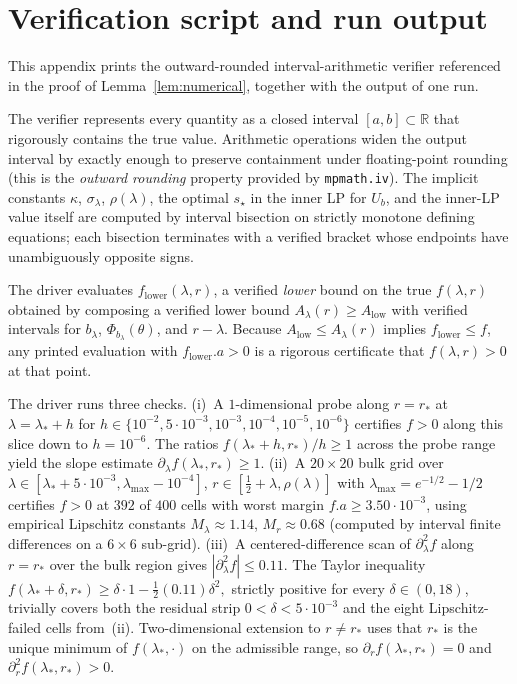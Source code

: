 \documentclass[11pt]{article}
\begin{document}
\clearpage
\appendix
\section{Verification script and run output}\label{app:script}

This appendix prints the outward-rounded interval-arithmetic verifier
referenced in the proof of Lemma~\ref{lem:numerical}, together with the
output of one run.

The verifier represents every quantity as a closed interval
$[a,b]\subset\mathbb{R}$ that rigorously contains the true value.
Arithmetic operations widen the output interval by exactly enough to
preserve containment under floating-point rounding (this is the
\emph{outward rounding} property provided by \texttt{mpmath.iv}). The
implicit constants $\kappa$, $\sigma_\lambda$, $\rho(\lambda)$, the
optimal $s_\star$ in the inner LP for $U_b$, and the inner-LP value
itself are computed by interval bisection on strictly monotone defining
equations; each bisection terminates with a verified bracket whose
endpoints have unambiguously opposite signs.

The driver evaluates $f_{\mathrm{lower}}(\lambda,r)$, a verified
\emph{lower} bound on the true $f(\lambda,r)$ obtained by composing a
verified lower bound $A_\lambda(r)\geq A_{\mathrm{low}}$ with verified
intervals for $b_\lambda$, $\Phi_{b_\lambda}(\theta)$, and $r-\lambda$.
Because $A_{\mathrm{low}}\le A_\lambda(r)$ implies
$f_{\mathrm{lower}}\le f$, any printed evaluation with
$f_{\mathrm{lower}}.a>0$ is a rigorous certificate that $f(\lambda,r)>0$
at that point.

The driver runs three checks. (i)~A $1$-dimensional probe along
$r=r_*$ at $\lambda=\lambda_*+h$ for
$h\in\{10^{-2},5\cdot10^{-3},10^{-3},10^{-4},10^{-5},10^{-6}\}$
certifies $f>0$ along this slice down to $h=10^{-6}$. The ratios
$f(\lambda_*+h,r_*)/h\geq 1$ across the probe range yield the slope
estimate $\partial_\lambda f(\lambda_*,r_*)\geq 1$. (ii)~A $20\times20$
bulk grid over
$\lambda\in[\lambda_*+5\cdot10^{-3},\lambda_{\max}-10^{-4}]$,
$r\in[\tfrac12+\lambda,\rho(\lambda)]$ with $\lambda_{\max}=e^{-1/2}-1/2$
certifies $f>0$ at $392$ of $400$ cells with worst margin $f.a\geq
3.50\cdot 10^{-3}$, using empirical Lipschitz constants
$M_\lambda\approx 1.14$, $M_r\approx 0.68$ (computed by interval
finite differences on a $6\times6$ sub-grid). (iii)~A centered-difference
scan of $\partial^2_\lambda f$ along $r=r_*$ over the bulk region gives
$|\partial^2_\lambda f|\leq 0.11$. The Taylor inequality
\(
        f(\lambda_*+\delta,r_*) \geq \delta\cdot 1 - \tfrac12(0.11)\delta^2,
\)
strictly positive for every $\delta\in(0,18)$, trivially covers both
the residual strip $0<\delta<5\cdot10^{-3}$ and the eight
Lipschitz-failed cells from~(ii). Two-dimensional extension to
$r\neq r_*$ uses that $r_*$ is the unique minimum of
$f(\lambda_*,\cdot)$ on the admissible range, so
$\partial_r f(\lambda_*,r_*)=0$ and $\partial^2_r f(\lambda_*,r_*)>0$.
\end{document}
